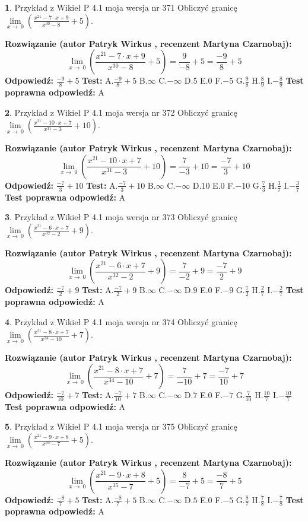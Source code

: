 \documentclass[12pt, a4paper]{article}
\theoremstyle{definition} %
\newtheorem{zad}{}
\newcommand{\zadStart}[1]{\begin{zad}#1\newline}
\newcommand{\zadStop}{\end{zad}}
\newcommand{\rozwStart}[2]{\noindent \textbf{Rozwiązanie (autor #1 , recenzent #2): }\newline}
\newcommand{\rozwStop}{\newline}
\newcommand{\odpStart}{\noindent \textbf{Odpowiedź:}\newline}
\newcommand{\odpStop}{\newline}
\newcommand{\testStart}{\noindent \textbf{Test:}\newline}
\newcommand{\testStop}{\newline}
\newcommand{\kluczStart}{\noindent \textbf{Test poprawna odpowiedź:}\newline}
\newcommand{\kluczStop}{\newline}
\begin{document}
\zadStart{Przykład z Wikieł P 4.1 moja wersja nr 371}
Obliczyć granicę $\lim\limits_{x\to\ 0}(\frac{x^{21}-7 \cdot x +9}{x^{30}-8}+5)$.
\zadStop
\rozwStart{Patryk Wirkus}{Martyna Czarnobaj}
$$\lim\limits_{x\to\ 0}(\frac{x^{21}-7 \cdot x +9}{x^{30}-8}+5)=\frac{9}{-8}+5=\frac{-9}{8}+5$$
\rozwStop
\odpStart
$\frac{-9}{8}+5$
\odpStop
\testStart
A.$\frac{-9}{8}+5$
B.$\infty$
C.$-\infty$
D.$5$
E.$0$
F.$-5$
G.$\frac{9}{8}$
H.$\frac{8}{9}$
I.$-\frac{8}{9}$
\testStop
\kluczStart
A
\kluczStop



\zadStart{Przykład z Wikieł P 4.1 moja wersja nr 372}
Obliczyć granicę $\lim\limits_{x\to\ 0}(\frac{x^{21}-10 \cdot x +7}{x^{31}-3}+10)$.
\zadStop
\rozwStart{Patryk Wirkus}{Martyna Czarnobaj}
$$\lim\limits_{x\to\ 0}(\frac{x^{21}-10 \cdot x +7}{x^{31}-3}+10)=\frac{7}{-3}+10=\frac{-7}{3}+10$$
\rozwStop
\odpStart
$\frac{-7}{3}+10$
\odpStop
\testStart
A.$\frac{-7}{3}+10$
B.$\infty$
C.$-\infty$
D.$10$
E.$0$
F.$-10$
G.$\frac{7}{3}$
H.$\frac{3}{7}$
I.$-\frac{3}{7}$
\testStop
\kluczStart
A
\kluczStop



\zadStart{Przykład z Wikieł P 4.1 moja wersja nr 373}
Obliczyć granicę $\lim\limits_{x\to\ 0}(\frac{x^{21}-6 \cdot x +7}{x^{32}-2}+9)$.
\zadStop
\rozwStart{Patryk Wirkus}{Martyna Czarnobaj}
$$\lim\limits_{x\to\ 0}(\frac{x^{21}-6 \cdot x +7}{x^{32}-2}+9)=\frac{7}{-2}+9=\frac{-7}{2}+9$$
\rozwStop
\odpStart
$\frac{-7}{2}+9$
\odpStop
\testStart
A.$\frac{-7}{2}+9$
B.$\infty$
C.$-\infty$
D.$9$
E.$0$
F.$-9$
G.$\frac{7}{2}$
H.$\frac{2}{7}$
I.$-\frac{2}{7}$
\testStop
\kluczStart
A
\kluczStop



\zadStart{Przykład z Wikieł P 4.1 moja wersja nr 374}
Obliczyć granicę $\lim\limits_{x\to\ 0}(\frac{x^{21}-8 \cdot x +7}{x^{34}-10}+7)$.
\zadStop
\rozwStart{Patryk Wirkus}{Martyna Czarnobaj}
$$\lim\limits_{x\to\ 0}(\frac{x^{21}-8 \cdot x +7}{x^{34}-10}+7)=\frac{7}{-10}+7=\frac{-7}{10}+7$$
\rozwStop
\odpStart
$\frac{-7}{10}+7$
\odpStop
\testStart
A.$\frac{-7}{10}+7$
B.$\infty$
C.$-\infty$
D.$7$
E.$0$
F.$-7$
G.$\frac{7}{10}$
H.$\frac{10}{7}$
I.$-\frac{10}{7}$
\testStop
\kluczStart
A
\kluczStop



\zadStart{Przykład z Wikieł P 4.1 moja wersja nr 375}
Obliczyć granicę $\lim\limits_{x\to\ 0}(\frac{x^{21}-9 \cdot x +8}{x^{35}-7}+5)$.
\zadStop
\rozwStart{Patryk Wirkus}{Martyna Czarnobaj}
$$\lim\limits_{x\to\ 0}(\frac{x^{21}-9 \cdot x +8}{x^{35}-7}+5)=\frac{8}{-7}+5=\frac{-8}{7}+5$$
\rozwStop
\odpStart
$\frac{-8}{7}+5$
\odpStop
\testStart
A.$\frac{-8}{7}+5$
B.$\infty$
C.$-\infty$
D.$5$
E.$0$
F.$-5$
G.$\frac{8}{7}$
H.$\frac{7}{8}$
I.$-\frac{7}{8}$
\testStop
\kluczStart
A
\kluczStop
\end{document}
